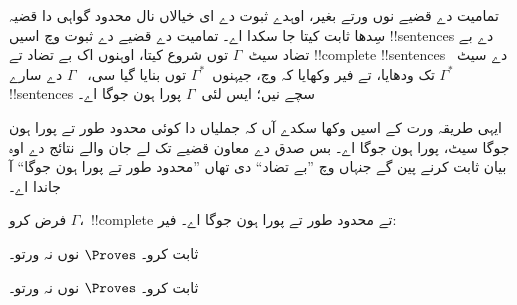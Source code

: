 \documentclass[../../../include/open-logic-section]{subfiles}
\begin{document}
      {}
      {}


تمامیت دے قضیے نوں ورتے بغیر، اوہدے ثبوت دے ای
خیالاں نال محدود گواہی دا قضیہ سِدھا ثابت
کیتا جا سکدا اے۔ تمامیت دے قضیے دے ثبوت وچ
اسیں !!{sentence}s دے بے تضاد سیٹ~$\Gamma$
توں شروع کیتا، اوہنوں اک بے تضاد تے !!{complete}
!!{sentence}s دے سیٹ~$\Gamma^*$ تک ودھایا،
تے فیر وکھایا کہ
وچ، جیہنوں~$\Gamma^*$ توں بنایا گیا سی،
~$\Gamma$ دے سارے !!{sentence}s
سچے نیں؛ ایس لئی~$\Gamma$ پورا ہون جوگا اے۔

ایہی طریقہ ورت کے اسیں وکھا سکدے آں کہ جملیاں
دا کوئی محدود طور تے پورا ہون جوگا سیٹ، پورا
ہون جوگا اے۔ بس صدق دے معاون قضیے تک لے جان والے نتائج
دے اوہ بیان ثابت کرنے پین گے جنہاں وچ
”بے تضاد“ دی تھاں ”محدود طور تے پورا
ہون جوگا“ آ جاندا اے۔

\begin{prop}
فرض کرو $\Gamma$،~!!{complete} تے محدود طور تے
پورا ہون جوگا اے۔ فیر:
\begin{enumerate}


\end{enumerate}
\end{prop}

\begin{prob}
ثابت کرو۔ $\Proves$ نوں نہ ورتو۔
\end{prob}
\tagendprob

\begin{prob}
ثابت کرو۔ $\Proves$ نوں نہ ورتو۔
\end{prob}
\tagendprob

\end{document}
